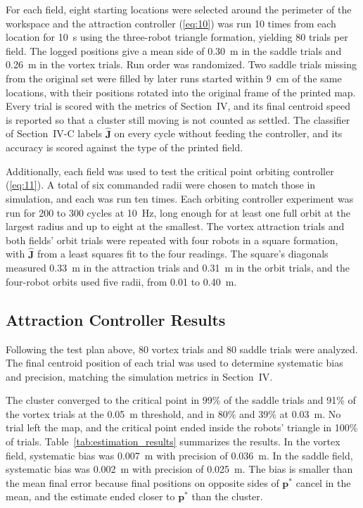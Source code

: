 \documentclass[lettersize,journal]{IEEEtran}
\newcommand{\rev}[1]{#1}
\begin{document}
For each field, eight starting locations were selected around the perimeter of the workspace and the attraction controller (\ref{eq:10}) was run 10 times from each location for \rev{10}~s using the three-robot triangle formation, yielding 80 trials per field. The logged positions give a mean side of \rev{0.30}~m in the saddle trials and \rev{0.26}~m in the vortex trials. Run order was randomized. Two saddle trials missing from the original set were filled by later runs started within \rev{9}~cm of the same locations, with their positions rotated into the original frame of the printed map. Every trial is scored with the metrics of Section~IV, and its final centroid speed is reported so that a cluster still moving is not counted as settled. The classifier of Section~IV-C labels $\hat{\mathbf{J}}$ on every cycle without feeding the controller, and its accuracy is scored against the type of the printed field.

Additionally, each field was used to test the critical point orbiting controller (\ref{eq:11}). A total of \rev{six} commanded radii were chosen to match those in simulation, and each was run \rev{ten} times. Each orbiting controller experiment was run for \rev{200 to 300} cycles at 10~Hz, long enough for at least one full orbit at the largest radius and up to eight at the smallest. The vortex attraction trials and both fields' orbit trials were repeated with four robots in a square formation, with $\hat{\mathbf{J}}$ from a least squares fit to the four readings. The square's diagonals measured \rev{0.33}~m in the attraction trials and \rev{0.31}~m in the orbit trials, and the four-robot orbits used five radii, from 0.01 to 0.40~m.

 \subsection{Attraction Controller Results}

Following the test plan above, \rev{80} vortex trials and \rev{80} saddle trials were analyzed. The final centroid position of each trial was used to determine systematic bias and precision, matching the simulation metrics in Section~IV.

The cluster converged to the critical point in \rev{99}\% of the saddle trials and \rev{91}\% of the vortex trials at the 0.05~m threshold, and in \rev{80}\% and \rev{39}\% at 0.03~m. No trial left the map, and the critical point ended inside the robots' triangle in \rev{100}\% of trials. Table~\ref{tab:estimation_results} summarizes the results. In the vortex field, systematic bias was \rev{0.007}~m with precision of \rev{0.036}~m. In the saddle field, systematic bias was \rev{0.002}~m with precision of \rev{0.025}~m. The bias is smaller than the mean final error because final positions on opposite sides of $\mathbf{p}^*$ cancel in the mean, and the estimate ended closer to $\mathbf{p}^*$ than the cluster.
\end{document}
